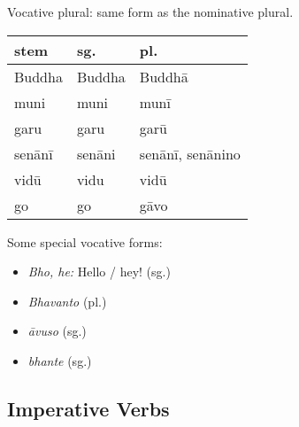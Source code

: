 \documentclass[11pt,oneside]{memoir}
\begin{document}
Vocative plural: same form as the nominative plural.

\bigskip
{\centering\par
\begin{multicols}{2}

\begin{center}
\begin{tabular}{lll}
stem & sg. & pl.\\[0pt]
\hline
Buddha & Buddha & Buddhā\\[0pt]
muni & muni & munī\\[0pt]
garu & garu & garū\\[0pt]
senānī & senāni & senānī, senānino\\[0pt]
vidū & vidu & vidū\\[0pt]
go & go & gāvo\\[0pt]
\end{tabular}
\end{center}

\columnbreak

Some special vocative forms:

\begin{itemize}
\item \emph{Bho, he:} Hello / hey! (sg.)
\item \emph{Bhavanto} (pl.)
\item \emph{āvuso} (sg.)
\item \emph{bhante} (sg.)
\end{itemize}

\end{multicols}
\par}

\clearpage

\subsection{Imperative Verbs}
\label{sec:orgd4dcd18}
\end{document}
